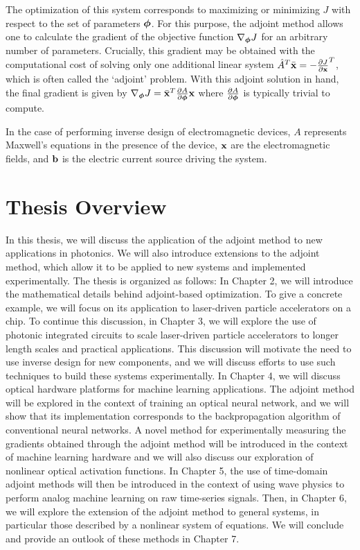 The optimization of this system corresponds to maximizing or minimizing $J$ with respect to the set of parameters $\bm{\phi}$.
For this purpose, the adjoint method allows one to calculate the gradient of the objective function $\nabla_{\bm{\phi}} J$ for an arbitrary number of parameters.
Crucially, this gradient may be obtained with the computational cost of solving only one additional linear system $\hat{A}^T \bar{\mathbf{x}} = -\frac{\partial J}{\partial \mathbf{x}}^T$, which is often called the `adjoint' problem.
With this adjoint solution in hand, the final gradient is given by $\nabla_{\bm{\phi}} J = \bar{\mathbf{x}}^T \frac{\partial A}{\partial \bm{\phi}} \mathbf{x}$ where $\frac{\partial A}{\partial \bm{\phi}}$ is typically trivial to compute.

In the case of performing inverse design of electromagnetic devices, $A$ represents Maxwell's equations in the presence of the device, $\mathbf{x}$ are the electromagnetic fields, and $\mathbf{b}$ is the electric current source driving the system.

\section{Thesis Overview}

In this thesis, we will discuss the application of the adjoint method to new applications in photonics.
We will also introduce extensions to the adjoint method, which allow it to be applied to new systems and implemented experimentally.
The thesis is organized as follows:
In Chapter 2, we will introduce the mathematical details behind adjoint-based optimization.  
To give a concrete example, we will focus on its application to laser-driven particle accelerators on a chip.
To continue this discussion, in Chapter 3, we will explore the use of photonic integrated circuits to scale laser-driven particle accelerators to longer length scales and practical applications.
This discussion will motivate the need to use inverse design for new components, and we will discuss efforts to use such techniques to build these systems experimentally.
In Chapter 4, we will discuss optical hardware platforms for machine learning applications.
The adjoint method will be explored in the context of training an optical neural network, and we will show that its implementation corresponds to the backpropagation algorithm of conventional neural networks.
A novel method for experimentally measuring the gradients obtained through the adjoint method will be introduced in the context of machine learning hardware and we will also discuss our exploration of nonlinear optical activation functions.
In Chapter 5, the use of time-domain adjoint methods will then be introduced in the context of using wave physics to perform analog machine learning on raw time-series signals.
Then, in Chapter 6, we will explore the extension of the adjoint method to general systems, in particular those described by a nonlinear system of equations.
We will conclude and provide an outlook of these methods in Chapter 7.
